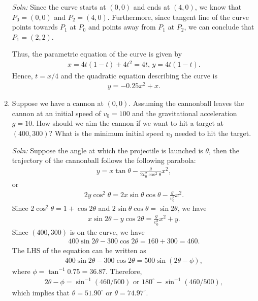 \documentclass{article}
\begin{document}
\begin{enumerate}
\begin{figure}[h]
\end{figure}

\emph{Soln:} Since the curve starts at $(0,0)$ and ends at $(4,0)$, we know that $P_0 = (0,0)$ and $P_2 = (4,0)$. Furthermore, since tangent line of the curve points towards $P_1$ at $P_0$ and points away from $P_1$ at $P_2$, we can conclude that $P_1 = (2,2)$.

Thus, the parametric equation of the curve is given by
\begin{align*}
  x = 4t(1-t) + 4t^2 = 4t,\,y = 4t(1-t).
\end{align*}
Hence, $t = x/4$ and the quadratic equation describing the curve is
\begin{align*}
 y = -0.25x^2 + x. 
\end{align*}


\item  Suppose we have a cannon at $(0,0)$. Assuming the cannonball leaves the cannon at an initial speed of $v_0=100$ and the gravitational acceleration $g = 10$. How should we aim the cannon if we want to hit a target at $(400,300)$? What is the minimum initial speed $v_0$ needed to hit the target. 

  \emph{Soln:} Suppose the angle at which the projectile is launched is $\theta$, then the trajectory of the cannonball follows the following parabola:
  \begin{align*}
    y = x\tan \theta  - \frac{g}{2v_0^2\cos^2\theta}x^2,
  \end{align*}
  or
  \begin{align*}
    2y\cos^2\theta = 2x\sin \theta\cos\theta - \frac{g}{v_0^2} x^2.
  \end{align*}
  Since $2\cos^2\theta = 1+\cos 2\theta$ and $2\sin\theta\cos\theta = \sin 2\theta$, we have
  \begin{align*}
    x \sin 2\theta - y\cos 2\theta = \frac{g}{v_0^2}x^2 + y.
  \end{align*}
  Since $(400,300)$ is on the curve, we have
  \begin{align*}
    400 \sin 2\theta - 300\cos 2\theta = 160 + 300 = 460.
  \end{align*}
  The LHS of the equation can be written as
  \begin{align*}
     400 \sin 2\theta - 300\cos 2\theta = 500 \sin(2\theta - \phi),
  \end{align*}
  where $\phi = \tan^{-1}0.75=36.87$. Therefore,
  \begin{align*}
    2\theta-\phi =\sin^{-1}(460/500)\text{ or }180^\circ-\sin^{-1}(460/500),
  \end{align*}
which implies that $\theta = 51.90^\circ$ or $\theta = 74.97^\circ$.


\end{enumerate}
\end{document}
